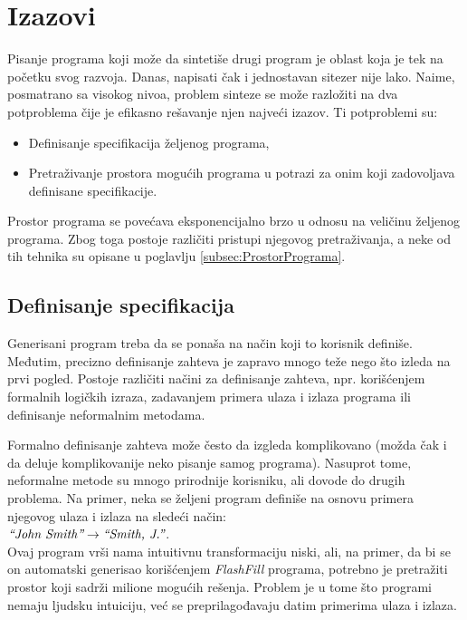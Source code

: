 \section{Izazovi}
\label{sec:Izazovi}

Pisanje programa koji može da sintetiše drugi program je oblast koja je tek na početku svog razvoja. Danas, napisati čak i jednostavan sitezer nije lako. Naime, posmatrano sa visokog nivoa, problem sinteze se može razložiti na dva potproblema čije je efikasno rešavanje njen najveći izazov. Ti potproblemi su:

\begin{itemize}
    \item Definisanje specifikacija željenog programa,
    \item Pretraživanje prostora mogućih programa u potrazi za onim koji zadovoljava definisane specifikacije.
\end{itemize}

Prostor programa se povećava eksponencijalno brzo u odnosu na ve\-li\-či\-nu željenog programa. Zbog toga postoje različiti pristupi njegovog pretraživanja, a neke od tih tehnika su opisane u poglavlju \ref{subsec:ProstorPrograma}.

\subsection{Definisanje specifikacija}
\label{subsec:DefinisanjeSpecifikacija}

Generisani program treba da se ponaša na način koji to korisnik definiše. Međutim, precizno definisanje zahteva je zapravo mnogo teže nego što izleda na prvi pogled. Postoje različiti načini za definisanje zahteva, npr. korišćenjem formalnih logičkih izraza, zadavanjem primera ulaza i izlaza programa ili definisanje neformalnim metodama.

Formalno definisanje zahteva može često da izgleda ko\-mpli\-ko\-va\-no (mo\-žda čak i da deluje komplikovanije neko pisanje samog programa). Nasuprot tome, neformalne metode su mnogo prirodnije korisniku, ali dovode do drugih problema. Na primer, neka se željeni program definiše na osnovu primera njegovog ulaza i izlaza na sledeći način: \\
\(\emph{“John Smith”} \rightarrow \emph{“Smith, J.”}\).\\
Ovaj program vrši nama intuitivnu transformaciju niski, ali, na primer, da bi se on automatski generisao korišćenjem \emph{FlashFill} \cite{FlashFill} programa, potrebno je pretražiti prostor koji sadrži milione mogućih rešenja. Problem je u tome što programi nemaju ljudsku intuiciju, već se pre\-pri\-la\-go\-đa\-va\-ju datim primerima ulaza i izlaza.

